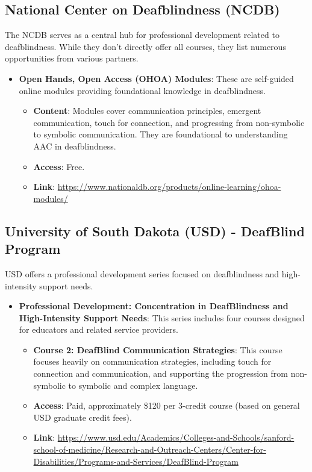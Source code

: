 \subsection{National Center on Deafblindness (NCDB)}
The NCDB serves as a central hub for professional development related to deafblindness. While they don't directly offer all courses, they list numerous opportunities from various partners.
\begin{itemize}
    \item \textbf{Open Hands, Open Access (OHOA) Modules}: These are self-guided online modules providing foundational knowledge in deafblindness.
    \begin{itemize}
        \item \textbf{Content}: Modules cover communication principles, emergent communication, touch for connection, and progressing from non-symbolic to symbolic communication. They are foundational to understanding AAC in deafblindness.
        \item \textbf{Access}: Free.
        \item \textbf{Link}: \url{https://www.nationaldb.org/products/online-learning/ohoa-modules/}
    \end{itemize}
\end{itemize}

\subsection{University of South Dakota (USD) - DeafBlind Program}
USD offers a professional development series focused on deafblindness and high-intensity support needs.
\begin{itemize}
    \item \textbf{Professional Development: Concentration in DeafBlindness and High-Intensity Support Needs}: This series includes four courses designed for educators and related service providers.
    \begin{itemize}
        \item \textbf{Course 2: DeafBlind Communication Strategies}: This course focuses heavily on communication strategies, including touch for connection and communication, and supporting the progression from non-symbolic to symbolic and complex language.
        \item \textbf{Access}: Paid, approximately \$120 per 3-credit course (based on general USD graduate credit fees).
        \item \textbf{Link}: \url{https://www.usd.edu/Academics/Colleges-and-Schools/sanford-school-of-medicine/Research-and-Outreach-Centers/Center-for-Disabilities/Programs-and-Services/DeafBlind-Program}
    \end{itemize}
\end{itemize}

